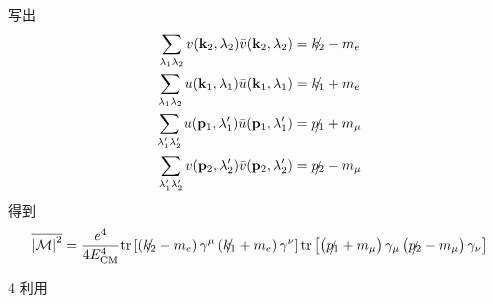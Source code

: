 写出
\begin{equation}
    \begin{aligned}
        \sum_{\lambda _1\lambda _2}{v(\mathbf{k}_2,\lambda _2)\bar{v}(\mathbf{k}_2,\lambda _2)}&=\slashed{k_2}-m_e
\\
\sum_{\lambda _1\lambda _2}{u(\mathbf{k}_1,\lambda _1)\bar{u}(\mathbf{k}_1,\lambda _1)}&=\slashed{k_1}+m_e
\\
\sum_{\lambda _{1}^{\prime}\lambda _{2}^{\prime}}{u(\mathbf{p}_1,\lambda _{1}^{\prime})\bar{u}(\mathbf{p}_1,\lambda _{1}^{\prime})}&=\slashed{p_1}+m_{\mu}
\\
\sum_{\lambda _{1}^{\prime}\lambda _{2}^{\prime}}{v(\mathbf{p}_2,\lambda _{2}^{\prime})\bar{v}(\mathbf{p}_2,\lambda _{2}^{\prime})}&=\slashed{p_2}-m_{\mu}
    \end{aligned}
\end{equation}
得到
\begin{equation}
    \overline{\left| \mathcal{M} \right|^2}=\frac{e^4}{4E_{\mathrm{CM}}^{4}}\mathrm{tr}\left[ \left( \slashed{k_2}-m_e \right) \gamma ^{\mu}\left( \slashed{k_1}+m_e \right) \gamma ^{\nu} \right] \mathrm{tr}\left[ \left( \slashed{p_1}+m_{\mu} \right) \gamma _{\mu}\left( \slashed{p_2}-m_{\mu} \right) \gamma _{\nu} \right] 
\end{equation}


4
利用

